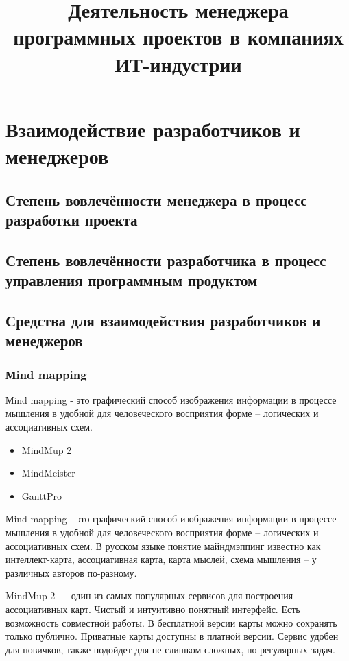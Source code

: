 \documentclass[]{../industrial-development}
\title{Деятельность менеджера программных проектов в компаниях ИТ-индустрии}
\author{}
\date{}
\begin{document}
\begin{frame}
  \titlepage
\end{frame}

\section{Взаимодействие разработчиков и менеджеров}

\subsection{Степень вовлечённости менеджера в процесс разработки проекта}
\subsection{Степень вовлечённости разработчика в процесс управления программным продуктом}
\subsection{Средства для взаимодействия разработчиков и менеджеров}

\begin{frame} \frametitle{Мind mapping} 
\begin{block}{}
Мind mapping - это графический способ изображения информации в процессе мышления в удобной для человеческого восприятия форме – логических и ассоциативных схем.
\end{block}
\begin{itemize}
\item MindMup 2 
\item MindMeister
\item GanttPro
\end{itemize}
\end{frame}

\lecturenotes

Мind mapping - это графический способ изображения информации в процессе мышления в удобной для человеческого восприятия форме – логических и ассоциативных схем. В русском языке понятие майндмэппинг известно как интеллект-карта, ассоциативная карта, карта мыслей, схема мышления – у различных авторов по-разному.

MindMup 2 — один из самых популярных сервисов для построения ассоциативных карт. Чистый и интуитивно понятный интерфейс. Есть возможность совместной работы. В бесплатной версии карты можно сохранять только публично. Приватные карты доступны в платной версии. Сервис удобен для новичков, также подойдет для не слишком сложных, но регулярных задач.
\end{document}
